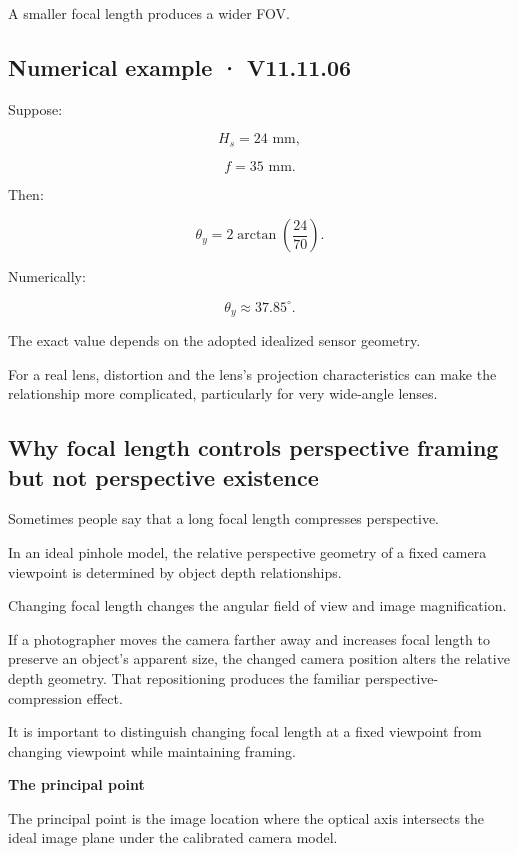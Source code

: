 A smaller focal length produces a wider FOV.

\subsection{Numerical example · V11.11.06}\label{02-foundations-ii-ch034-numerical-example-v11.11.06}

Suppose:

\[
 H_s=24\text{ mm},
\]

\[
 f=35\text{ mm}.
\]

Then:

\[
 \theta_y= 2\arctan\left(\frac{24}{70}\right).
\]

Numerically:

\[
 \boxed{ \theta_y\approx37.85^\circ }.
\]

The exact value depends on the adopted idealized sensor geometry.

For a real lens, distortion and the lens's projection characteristics can make the relationship more complicated, particularly for very wide-angle lenses.

\subsection{Why focal length controls perspective framing but not perspective existence}\label{02-foundations-ii-ch034-why-focal-length-controls-perspective-framing-but-not-perspective-existence}

Sometimes people say that a long focal length compresses perspective.

In an ideal pinhole model, the relative perspective geometry of a fixed camera viewpoint is determined by object depth relationships.

Changing focal length changes the angular field of view and image magnification.

If a photographer moves the camera farther away and increases focal length to preserve an object's apparent size, the changed camera position alters the relative depth geometry. That repositioning produces the familiar perspective-compression effect.

It is important to distinguish changing focal length at a fixed viewpoint from changing viewpoint while maintaining framing.

\textbf{The principal point}

The principal point is the image location where the optical axis intersects the ideal image plane under the calibrated camera model.

